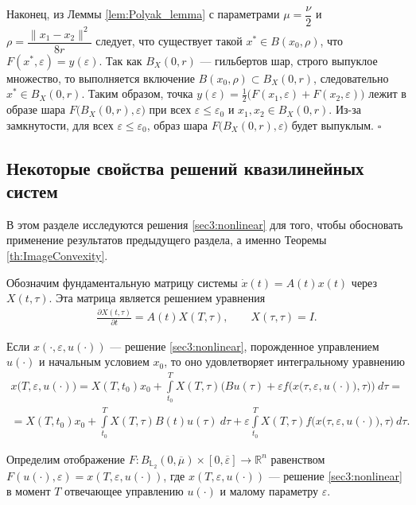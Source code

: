 \documentclass[../main.tex]{subfiles}
\begin{document}
Наконец, из Леммы \ref{lem:Polyak_lemma} с параметрами $\mu=\dfrac{\nu}{2}$ и $\rho=\dfrac{\|x_1-x_2\|^2}{8r}$ следует, что существует такой $x^*\in B(x_0, \rho)$, что $F(x^*,\varepsilon) = y(\varepsilon)$.
Так как $B_X(0, r)$ --- гильбертов шар, строго выпуклое множество, то выполняется включение $B(x_0, \rho) \subset B_X(0, r)$, следовательно $x^* \in B_X(0, r)$. 
Таким образом, точка $y(\varepsilon) = \frac{1}{2} \big( F(x_1,\varepsilon) + F(x_2,\varepsilon)\big)$ лежит в образе шара $F\big(B_X(0,r),\varepsilon\big) $ при всех $\varepsilon \leqslant \varepsilon_0$ и $x_1, x_2 \in B_X(0,r)$. 
Из-за замкнутости, для всех $\varepsilon \leqslant \varepsilon_0$, образ шара $F\big(B_X(0,r),\varepsilon\big) $ будет выпуклым.
\hfill$\square$\\[1ex]%

\subsection{Некоторые свойства решений квазилинейных систем}


В этом разделе исследуются решения \eqref{sec3:nonlinear} для того, чтобы обосновать применение результатов предыдущего раздела, а именно Теоремы \ref{th:ImageConvexity}. 

Обозначим фундаментальную матрицу системы $\dot{x}(t) = A(t) x(t)$ через $X(t,\tau)$.
Эта матрица является решением уравнения
\begin{gather*}
 \frac{\partial X(t,\tau)}{\partial t} = A(t) X(T,\tau), \qquad X(\tau,\tau) = I.
\end{gather*}

Если $x(\cdot,\varepsilon, u(\cdot))$ --- решение \eqref{sec3:nonlinear}, порожденное управлением $u(\cdot)$ и начальным условием $x_0$, то оно удовлетворяет интегральному уравнению
\begin{gather*}
 x\big(T,\varepsilon, u(\cdot)\big) =
 X(T,t_0)x_0 + 
 \int\limits_{t_0}^T X(T,\tau) \bigg(Bu(\tau) +
 \varepsilon f\Big(x\big(\tau,\varepsilon, u(\cdot)\big),\tau\Big) \bigg)\ d\tau = \\ =
 X(T,t_0)x_0 +
 \int\limits_{t_0}^T X(T,\tau) B(t)u(\tau)\ d\tau 
 + \varepsilon \int\limits_{t_0}^T X(T,\tau) f\Big(x\big(\tau,\varepsilon, u(\cdot)\big),\tau\Big) \ d\tau.
\end{gather*}

Определим отображение $F:B_{\mathbb{L}_2}(0,\overline{\mu})\times [0,\overline{\varepsilon}] \to \mathbb{R}^n$ равенством $F(u(\cdot),\varepsilon) = x(T,\varepsilon,u(\cdot))$, где $x(T,\varepsilon,u(\cdot))$ --- решение \eqref{sec3:nonlinear} в момент $T$ отвечающее управлению $u(\cdot)$ и малому параметру $\varepsilon$.
\end{document}
